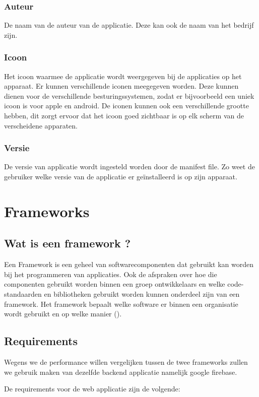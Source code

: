 \subsubsection{Auteur}
De naam van de auteur van de applicatie. Deze kan ook de naam van het bedrijf zijn.

\subsubsection{Icoon}
Het icoon waarmee de applicatie wordt weergegeven bij de applicaties op het apparaat. Er kunnen verschillende iconen meegegeven worden. Deze kunnen dienen voor de verschillende besturingssystemen, zodat er bijvoorbeeld een uniek icoon is voor apple en android. De iconen kunnen ook een verschillende grootte hebben, dit zorgt ervoor dat het icoon goed zichtbaar is op elk scherm van de verscheidene apparaten.

\subsubsection{Versie}
De versie van applicatie wordt ingesteld worden door de manifest file. Zo weet de gebruiker welke versie van de applicatie er geïnstalleerd is op zijn apparaat.

\section{Frameworks}
\subsection{Wat is een framework ?}
Een Framework is een geheel van softwarecomponenten dat gebruikt kan worden bij het programmeren van applicaties. Ook de afspraken over hoe die componenten gebruikt worden binnen een groep ontwikkelaars en welke code-standaarden en bibliotheken gebruikt worden kunnen onderdeel zijn van een framework. Het framework bepaalt welke software er binnen een organisatie wordt gebruikt en op welke manier (\cite{WIKI_FRAMEWORK}).

\subsection{Requirements}
Wegens we de performance willen vergelijken tussen de twee frameworks zullen we gebruik maken van dezelfde backend applicatie namelijk google firebase.

De requirements voor de web applicatie zijn de volgende:

